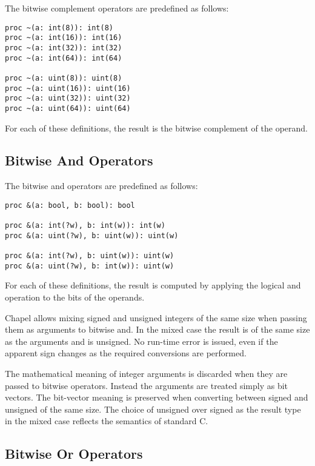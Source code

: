 The bitwise complement operators are predefined as follows:
\begin{chapel}
\begin{verbatim}
proc ~(a: int(8)): int(8)
proc ~(a: int(16)): int(16)
proc ~(a: int(32)): int(32)
proc ~(a: int(64)): int(64)

proc ~(a: uint(8)): uint(8)
proc ~(a: uint(16)): uint(16)
proc ~(a: uint(32)): uint(32)
proc ~(a: uint(64)): uint(64)
\end{verbatim}
\end{chapel}
For each of these definitions, the result is the bitwise complement of
the operand.

\subsection{Bitwise And Operators}
\label{Bitwise_And_Operators}

The bitwise and operators are predefined as follows:
\begin{chapel}
\begin{verbatim}
proc &(a: bool, b: bool): bool

proc &(a: int(?w), b: int(w)): int(w)
proc &(a: uint(?w), b: uint(w)): uint(w)

proc &(a: int(?w), b: uint(w)): uint(w)
proc &(a: uint(?w), b: int(w)): uint(w)
\end{verbatim}
\end{chapel}
For each of these definitions, the result is
computed by applying the logical and operation to the bits of the
operands.

Chapel allows mixing signed and unsigned integers of the same size
when passing them as arguments to bitwise and.
In the mixed case the result is of the same size as the arguments
and is unsigned.
No run-time error is issued, even if the apparent sign changes as the
required conversions are performed.

\begin{rationale}
The mathematical meaning of integer arguments
is discarded when they are passed to bitwise operators.
Instead the arguments are treated simply as bit vectors.
The bit-vector meaning is preserved when converting
between signed and unsigned of the same size.
The choice of unsigned over signed as the result type in the mixed case
reflects the semantics of standard C.
\end{rationale}

\subsection{Bitwise Or Operators}
\label{Bitwise_Or_Operators}

